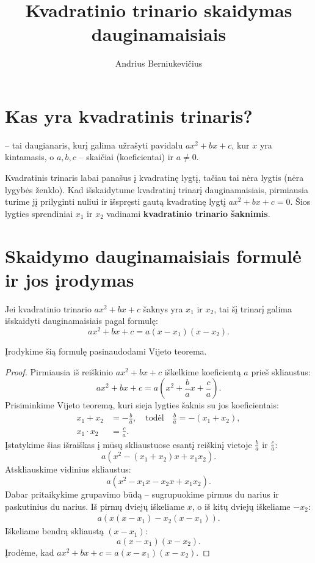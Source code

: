 \documentclass[11pt,a4paper]{scrartcl}
\title{Kvadratinio trinario skaidymas dauginamaisiais}
\author{Andrius Berniukevičius}
\begin{document}
\maketitle

\section{Kas yra kvadratinis trinaris?}

\begin{definition}
 -- tai daugianaris, kurį galima užrašyti pavidalu $ax^2+bx+c$, kur $x$ yra kintamasis, o $a, b, c$ -- skaičiai (koeficientai) ir $a \neq 0$.
\end{definition}

Kvadratinis trinaris labai panašus į kvadratinę lygtį, tačiau tai nėra lygtis (nėra lygybės ženklo). Kad išskaidytume kvadratinį trinarį dauginamaisiais, pirmiausia turime jį prilyginti nuliui ir išspręsti gautą kvadratinę lygtį $ax^2+bx+c=0$. Šios lygties sprendiniai $x_1$ ir $x_2$ vadinami \textbf{kvadratinio trinario šaknimis}.

\section{Skaidymo dauginamaisiais formulė ir jos įrodymas}

\begin{property}
Jei kvadratinio trinario $ax^2+bx+c$ šaknys yra $x_1$ ir $x_2$, tai šį trinarį galima išskaidyti dauginamaisiais pagal formulę:
\[ ax^2+bx+c = a(x-x_1)(x-x_2). \]
\end{property}

Įrodykime šią formulę pasinaudodami Vijeto teorema.

\begin{proof}
Pirmiausia iš reiškinio $ax^2+bx+c$ iškelkime koeficientą $a$ prieš skliaustus:
\[ ax^2+bx+c = a\left(x^2 + \frac{b}{a}x + \frac{c}{a}\right). \]
Prisiminkime Vijeto teoremą, kuri sieja lygties šaknis su jos koeficientais:
\[
\begin{aligned}
x_1 + x_2 &= -\frac{b}{a}, \quad \text{todėl} \quad \frac{b}{a} = -(x_1 + x_2), \\
x_1 \cdot x_2 &= \frac{c}{a}.
\end{aligned}
\]
Įstatykime šias išraiškas į mūsų skliaustuose esantį reiškinį vietoje $\frac{b}{a}$ ir $\frac{c}{a}$:
\[ a\left(x^2 - (x_1 + x_2)x + x_1 x_2\right). \]
Atskliauskime vidinius skliaustus:
\[ a\left(x^2 - x_1 x - x_2 x + x_1 x_2\right). \]
Dabar pritaikykime grupavimo būdą -- sugrupuokime pirmus du narius ir paskutinius du narius. Iš pirmų dviejų iškeliame $x$, o iš kitų dviejų iškeliame $-x_2$:
\[
\begin{aligned}
a\left( x(x - x_1) - x_2(x - x_1) \right).
\end{aligned}
\]
Iškeliame bendrą skliaustą $(x - x_1)$:
\[ a(x - x_1)(x - x_2). \]
Įrodėme, kad $ax^2+bx+c = a(x-x_1)(x-x_2)$.
\end{proof}
\end{document}
